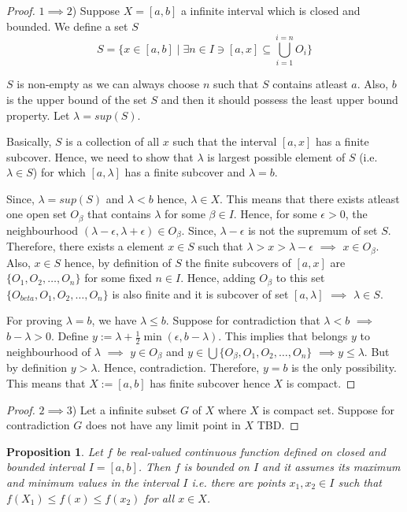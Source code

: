 \documentclass[12pt]{report}
\newtheorem{prop}{Proposition}
\begin{document}
\begin{proof}
    $1\implies 2$) Suppose $X = [a,b]$ a infinite interval which is closed and bounded. We define a set $S$
    $$ S = \{x \in [a,b] \mid \exists n \in I \ni [a,x] \subseteq \bigcup\limits_{i = 1}^{i = n} O_i\}$$

    $S$ is non-empty as we can always choose $n$ such that $S$ contains atleast $a$. Also, $b$ is the upper bound of the set $S$ and then it should possess the least upper bound property. Let $\lambda = sup(S)$.

    Basically, $S$ is a collection of all $x$ such that the interval $[a, x]$ has a finite subcover. Hence, we need to show that $\lambda$ is largest possible element of $S$ (i.e. $\lambda \in S$) for which $[a, \lambda]$ has a finite subcover and $\lambda = b$.

    Since, $\lambda = sup(S)$ and $\lambda < b$ hence, $\lambda \in X$. This means that there exists atleast one open set $O_{\beta}$ that contains $\lambda$ for  some $\beta \in I$. Hence, for some $\epsilon > 0$, the neighbourhood $(\lambda - \epsilon, \lambda + \epsilon) \in O_{\beta}$. Since, $\lambda - \epsilon$ is not the supremum of set $S$. Therefore, there exists a element $x \in S$ such that $\lambda > x > \lambda - \epsilon$ $\implies$ $x \in O_{\beta}$. Also, $x \in S$ hence, by definition of $S$ the finite subcovers of $[a, x]$ are $\{ O_1, O_2, \dots, O_{n}\}$ for some fixed $n \in I$. Hence, adding $O_{\beta}$ to this set $\{ O_{beta}, O_1, O_2, \dots, O_{n}\}$ is also finite and it is subcover of set $[a, \lambda]$ $\implies$ $\lambda \in S$.

    For proving $\lambda = b$, we have $\lambda \leq b$. Suppose for contradiction that $\lambda < b$ $\implies$ $b - \lambda > 0$. Define $y := \lambda + \frac{1}{2}\min(\epsilon, b-\lambda)$. This implies that belongs $y$ to neighbourhood of $\lambda$ $\implies$ $ y \in O_{\beta}$ and $y \in \bigcup\{ O_{\beta}, O_1, O_2, \dots, O_{n}\}$ $\implies y \leq \lambda$. But by definition $y > \lambda$. Hence, contradiction. Therefore, $y = b$ is the only possibility. This means that $X:= [a, b]$ has finite subcover hence $X$ is compact.
\end{proof}
\begin{proof}
    $2 \implies 3$) Let a infinite subset $G$ of $X$ where $X$ is compact set. Suppose for contradiction $G$ does not have any limit point in $X$ TBD.
\end{proof}
\begin{prop}
    Let $f$ be real-valued continuous function defined on closed and bounded interval $I = [a, b]$. Then $f$ is bounded on $I$ and it assumes its maximum and minimum values in the interval $I$ i.e. there are points $x_1, x_2 \in I$ such that $f(X_1) \leq f(x)  \leq f(x_2)$ for all $x \in X$.
\end{prop}
\end{document}
